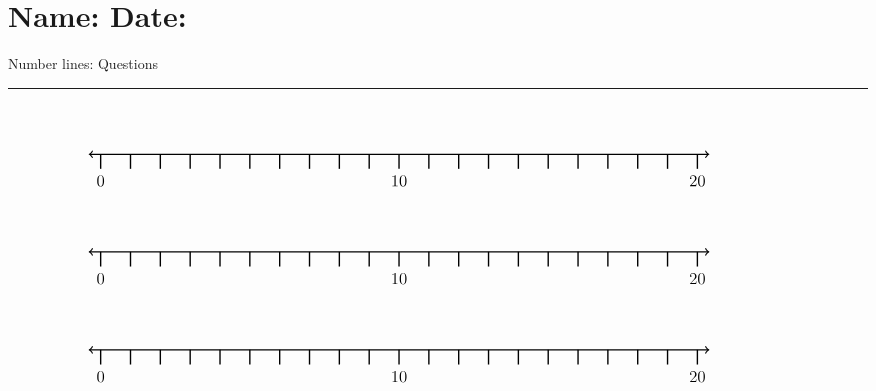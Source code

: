 \documentclass[leqno, 12pt]{article}
\def \HeadingQuestions {\section*{\Large Name: \underline{\hspace{8cm}} \hfill Date: \underline{\hspace{3cm}}} \vspace{-3mm}
{Number lines: Questions} \vspace{1pt}\hrule}
\begin{document}
  \HeadingQuestions
  \vspace{-1mm}
  \begin{equation}
    \begin{tikzpicture}[scale=0.75, baseline={([yshift=-1pt]current bounding box.north)}]
        \draw[{To[scale=1.3]}-{To[scale=1.3]}, line width=1pt] (-0.4, 0) -- (20.4, 0);
        \foreach \x in {0,1,...,20}
            \draw[shift={(\x,0)},color=black, line width=1pt] (0pt,-14pt) -- (0pt,0pt);
        \foreach \x in {0,10,20}
            \draw[shift={(\x,-0.8)},color=black] node[font=\large,text height=12pt] {$\x$};
        \node [font=\large, minimum width=30mm] at (21,1.2) {$  $};
    \end{tikzpicture}
\end{equation}
\vspace{10pt}\begin{equation}
    \begin{tikzpicture}[scale=0.75, baseline={([yshift=-1pt]current bounding box.north)}]
        \draw[{To[scale=1.3]}-{To[scale=1.3]}, line width=1pt] (-0.4, 0) -- (20.4, 0);
        \foreach \x in {0,1,...,20}
            \draw[shift={(\x,0)},color=black, line width=1pt] (0pt,-14pt) -- (0pt,0pt);
        \foreach \x in {0,10,20}
            \draw[shift={(\x,-0.8)},color=black] node[font=\large,text height=12pt] {$\x$};
        \node [font=\large, minimum width=30mm] at (21,1.2) {$  $};
    \end{tikzpicture}
\end{equation}
\vspace{10pt}\begin{equation}
    \begin{tikzpicture}[scale=0.75, baseline={([yshift=-1pt]current bounding box.north)}]
        \draw[{To[scale=1.3]}-{To[scale=1.3]}, line width=1pt] (-0.4, 0) -- (20.4, 0);
        \foreach \x in {0,1,...,20}
            \draw[shift={(\x,0)},color=black, line width=1pt] (0pt,-14pt) -- (0pt,0pt);
        \foreach \x in {0,10,20}
            \draw[shift={(\x,-0.8)},color=black] node[font=\large,text height=12pt] {$\x$};
        \node [font=\large, minimum width=30mm] at (21,1.2) {$  $};
    \end{tikzpicture}
\end{equation}
\end{document}

